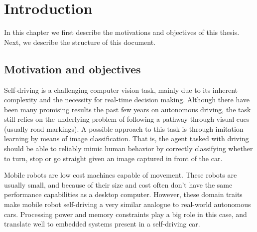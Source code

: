 \chapter{Introduction}\label{chp:introduction}


In this chapter we first describe the motivations and objectives of this thesis. Next, we describe
the structure of this document.

\section{Motivation and objectives}

Self-driving is a challenging computer vision task, mainly due to its inherent complexity and the
necessity for real-time decision making. Although there have been many promising results the past
few years on autonomous driving, the task still relies on the underlying problem of following a
pathway through visual cues (usually road markings). A possible approach to this task is through
imitation learning by means of image classification. That is, the agent tasked with driving should
be able to reliably mimic human behavior by correctly classifying whether to turn, stop or go
straight given an image captured in front of the car.

Mobile robots are low cost machines capable of movement. These robots are usually small, and
because of their size and cost often don't have the same performance capabilities as a desktop
computer. However, these domain traits make mobile robot self-driving a very similar analogue to
real-world autonomous cars. Processing power and memory constraints play a big role in this case,
and translate well to embedded systems present in a self-driving car.

